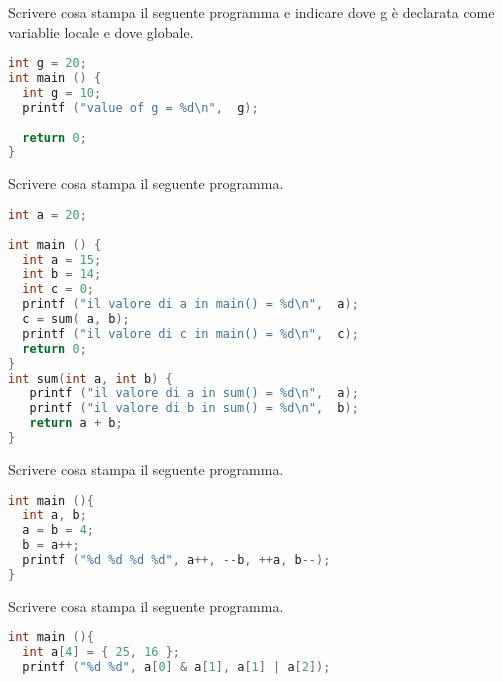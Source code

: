 \documentclass[addpoints,11pt]{exam}
\begin{document}
\begin{questions}
\question[2]
Scrivere cosa stampa il seguente programma e indicare dove g è declarata come variablie locale e dove globale.

\begin{minipage}[t]{0.4\linewidth}
\begin{lstlisting}[language=C]
int g = 20;
int main () {
  int g = 10;
  printf ("value of g = %d\n",  g);
 
  return 0;
}

\end{lstlisting}
\end{minipage}
\begin{minipage}[t]{0.6\linewidth}
       \makeemptybox{70pt}
\end{minipage}

\newpage
\question[4]
Scrivere cosa stampa il seguente programma.

\begin{minipage}[t]{0.4\linewidth}
\begin{lstlisting}[language=C]
int a = 20;
 
int main () {
  int a = 15;
  int b = 14;
  int c = 0;
  printf ("il valore di a in main() = %d\n",  a);
  c = sum( a, b);
  printf ("il valore di c in main() = %d\n",  c);
  return 0;
}
int sum(int a, int b) {
   printf ("il valore di a in sum() = %d\n",  a);
   printf ("il valore di b in sum() = %d\n",  b);
   return a + b;
}
\end{lstlisting}
\end{minipage}
\begin{minipage}[t]{0.6\linewidth}
       \makeemptybox{150pt}
\end{minipage}

\question[3]
Scrivere cosa stampa il seguente programma.

\begin{minipage}[t]{0.4\linewidth}
\begin{lstlisting}[language=C]
int main (){
  int a, b;
  a = b = 4;
  b = a++;
  printf ("%d %d %d %d", a++, --b, ++a, b--);
}
\end{lstlisting}
\end{minipage}
\begin{minipage}[t]{0.6\linewidth}
       \makeemptybox{70pt}
\end{minipage}

\question[3]
Scrivere cosa stampa il seguente programma.

\begin{minipage}[t]{0.4\linewidth}
\begin{lstlisting}[language=C]
int main (){
  int a[4] = { 25, 16 };
  printf ("%d %d", a[0] & a[1], a[1] | a[2]);


\end{lstlisting}
\end{minipage}
\end{questions}
\end{document}
